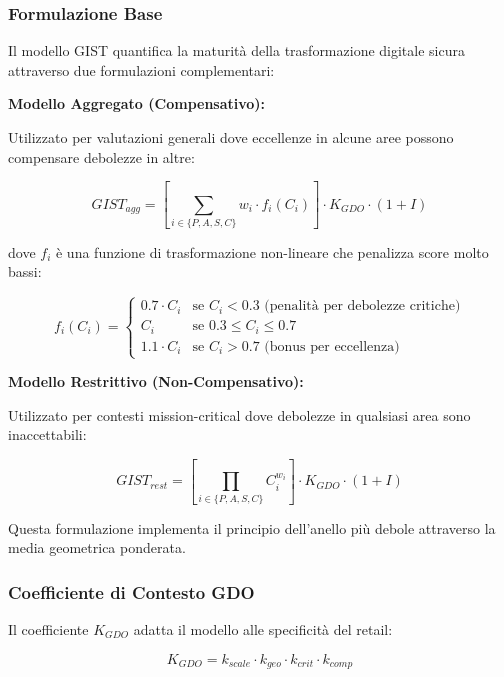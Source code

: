\subsubsection{Formulazione Base}

Il modello GIST quantifica la maturità della trasformazione digitale sicura attraverso due formulazioni complementari:

\textbf{Modello Aggregato (Compensativo):}

Utilizzato per valutazioni generali dove eccellenze in alcune aree possono compensare debolezze in altre:

\begin{equation}
GIST_{agg} = \left[\sum_{i \in \{P,A,S,C\}} w_i \cdot f_i(C_i)\right] \cdot K_{GDO} \cdot (1+I)
\label{eq:gist_aggregato}
\end{equation}

dove $f_i$ è una funzione di trasformazione non-lineare che penalizza score molto bassi:

\begin{equation}
f_i(C_i) = \begin{cases}
    0.7 \cdot C_i & \text{se } C_i < 0.3 \text{ (penalità per debolezze critiche)} \\
    C_i & \text{se } 0.3 \leq C_i \leq 0.7 \\
    1.1 \cdot C_i & \text{se } C_i > 0.7 \text{ (bonus per eccellenza)}
\end{cases}
\end{equation}

\textbf{Modello Restrittivo (Non-Compensativo):}

Utilizzato per contesti mission-critical dove debolezze in qualsiasi area sono inaccettabili:

\begin{equation}
GIST_{rest} = \left[\prod_{i \in \{P,A,S,C\}} C_i^{w_i}\right] \cdot K_{GDO} \cdot (1+I)
\label{eq:gist_restrittivo}
\end{equation}

Questa formulazione implementa il principio dell'anello più debole attraverso la media geometrica ponderata.

\subsubsection{Coefficiente di Contesto GDO}

Il coefficiente $K_{GDO}$ adatta il modello alle specificità del retail:

\begin{equation}
K_{GDO} = k_{scale} \cdot k_{geo} \cdot k_{crit} \cdot k_{comp}
\label{eq:k_gdo}
\end{equation}

